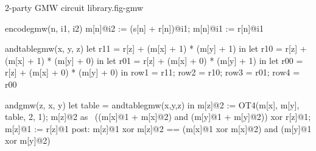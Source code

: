 \begin{fpfig}[t]{2-party GMW circuit library.}{fig-gmw}
{\footnotesize
  \begin{verbatimtab}
encodegmw(n, i1, i2) {
    m[n]@i2 := (s[n] + r[n])@i1;
    m[n]@i1 := r[n]@i1
}

andtablegmw(x, y, z) {
    let r11 = r[z] + (m[x] + 1) * (m[y] + 1) in
    let r10 = r[z] + (m[x] + 1) * (m[y] + 0) in
    let r01 = r[z] + (m[x] + 0) * (m[y] + 1) in
    let r00 = r[z] + (m[x] + 0) * (m[y] + 0) in
    { row1 = r11; row2 = r10; row3 = r01; row4 = r00 }
}

andgmw(z, x, y) {
   let table = andtablegmw(x,y,z) in
   m[z]@2 := OT4(m[x], m[y], table, 2, 1);
   m[z]@2 as ~((m[x]@1 + m[x]@2) and (m[y]@1 + m[y]@2)) xor r[z]@1;
   m[z]@1 := r[z]@1
}
post:
{  m[z]@1 xor m[z]@2 == (m[x]@1 xor m[x]@2) and (m[y]@1 xor m[y]@2) }
\end{verbatimtab}
}
\end{fpfig}


\begin{comment}
xorgmw(z, x, y) {
        m[z]@1 := (m[x] + m[y])@1; m[z]@2 := (m[x] + m[y])@2
}

decodegmw(z) {
        p["1"] := m[z]@1; p["2"] := m[z]@2;
        out@1 := (p["1"] + p["2"])@1;
        out@2 := (p["1"] + p["2"])@2
}
\end{comment}
